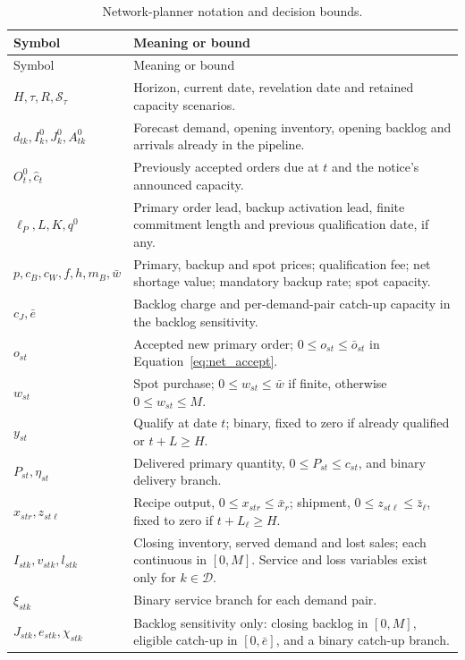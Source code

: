 \documentclass[preprint,11pt,authoryear]{elsarticle}
\begin{document}
\begin{longtable}{>{\raggedright\arraybackslash}p{3.8cm}>{\raggedright\arraybackslash}p{9.9cm}}
\caption{Network-planner notation and decision bounds.}\label{tab:network_notation}\\\toprule
Symbol & Meaning or bound\\\midrule\endfirsthead
Symbol & Meaning or bound\\\midrule\endhead\bottomrule\endfoot
$H,\tau,R,\mathcal S_\tau$ & Horizon, current date, revelation date and retained capacity scenarios.\\
$d_{tk},I^0_k,J^0_k,A^0_{tk}$ & Forecast demand, opening inventory, opening backlog and arrivals already in the pipeline.\\
$O^0_t,\widehat c_t$ & Previously accepted orders due at $t$ and the notice's announced capacity.\\
$\ell_P,L,K,q^0$ & Primary order lead, backup activation lead, finite commitment length and previous qualification date, if any.\\
$p,c_B,c_W,f,h,m_B,\bar w$ & Primary, backup and spot prices; qualification fee; net shortage value; mandatory backup rate; spot capacity.\\
$c_J,\bar e$ & Backlog charge and per-demand-pair catch-up capacity in the backlog sensitivity.\\
$o_{st}$ & Accepted new primary order; $0\le o_{st}\le\bar o_{st}$ in Equation~\eqref{eq:net_accept}.\\
$w_{st}$ & Spot purchase; $0\le w_{st}\le\bar w$ if finite, otherwise $0\le w_{st}\le M$.\\
$y_{st}$ & Qualify at date $t$; binary, fixed to zero if already qualified or $t+L\ge H$.\\
$P_{st},\eta_{st}$ & Delivered primary quantity, $0\le P_{st}\le c_{st}$, and binary delivery branch.\\
$x_{str},z_{st\ell}$ & Recipe output, $0\le x_{str}\le\bar x_r$; shipment, $0\le z_{st\ell}\le\bar z_\ell$, fixed to zero if $t+L_\ell\ge H$.\\
$I_{stk},v_{stk},l_{stk}$ & Closing inventory, served demand and lost sales; each continuous in $[0,M]$. Service and loss variables exist only for $k\in\mathcal D$.\\
$\xi_{stk}$ & Binary service branch for each demand pair.\\
$J_{stk},e_{stk},\chi_{stk}$ & Backlog sensitivity only: closing backlog in $[0,M]$, eligible catch-up in $[0,\bar e]$, and a binary catch-up branch.\\
\end{longtable}
\end{document}
